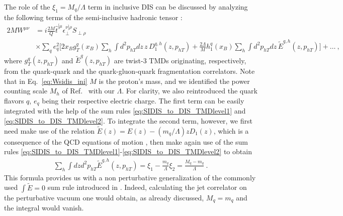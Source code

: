 \documentclass[preprintnumbers,floatfix,nofootinbib]{revtex4}
\newcommand{\xbj}{{x_B}}                   %
\newcommand{\mj}{M_q}
\newcommand{\mq}{m_q}
\begin{document}
The role of the $\xi_1=M_q/\Lambda$ term in inclusive DIS can be discussed by analyzing the following terms of the semi-inclusive hadronic tensor \cite{Mulders:1995dh}:
\begin{align}
  \label{eq:Wsidis_ini}
  2 M  W^{\mu\nu}
    & = i \frac{2M}{Q} \hat t^{[\mu}_{\phantom \perp} 
    \epsilon_\perp^{\nu]\rho}S_{\perp\rho} \\
    & \times \sum_q e_q^2
    \bigg[ 2 \xbj g_T^q(\xbj) \sum_h \int d^2p_{hT} dz \, z\, D_1^{q,h}(z,p_{hT}) 
  + \frac{2\Lambda}{M} h_1^q(\xbj) \sum_h \int d^2p_{hT}  dz \, \tilde E^{q,h}(z,p_{hT}) \bigg] + \ldots \ , \nonumber
\end{align}
where $g_T^q(z,p_{hT})$ and $\tilde E^q(z,p_{hT})$ are twist-3 TMDs originating, respectively, from the quark-quark and the quark-gluon-quark fragmentation correlators. Note that in Eq.~\eqref{eq:Wsidis_ini} $M$ is the proton's mass, and we identified the power counting scale $M_h$ of Ref.~\cite{Mulders:1995dh} with our $\Lambda$. For clarity, we also reintroduced the quark flavors $q$, $e_q$ being their respective electric charge. 
The first term can be easily integrated with the help of the sum rules
\eqref{eq:SIDIS_to_DIS_TMDlevel1} and \eqref{eq:SIDIS_to_DIS_TMDlevel2}. To integrate the second term, however, we first need make
use of the relation $\tilde E(z) = E(z) - (\mq/\Lambda) z D_1(z)$, which is a
consequence of the QCD equations of motion \cite{Bacchetta:2006tn}, then
make again use of the sum rules \eqref{eq:SIDIS_to_DIS_TMDlevel1}-\eqref{eq:SIDIS_to_DIS_TMDlevel2} to obtain
\begin{align}
  \sum_h \int dz d^2p_{hT} \tilde E^{q,h}(z,p_{hT}) 
    = \xi_1 - \frac{\mq}{\Lambda} \xi_2 = \frac{\mj - \mq}{\Lambda }\ .
\end{align}
This formula provides us with a
non perturbative generalization of the commonly used $\int\tilde E =0$ sum
rule introduced in \cite{Jaffe:1996zw}. Indeed, calculating the jet correlator 
on the perturbative vacuum one would obtain, as already discussed, $\mj=\mq$
and the integral would vanish.
\end{document}
